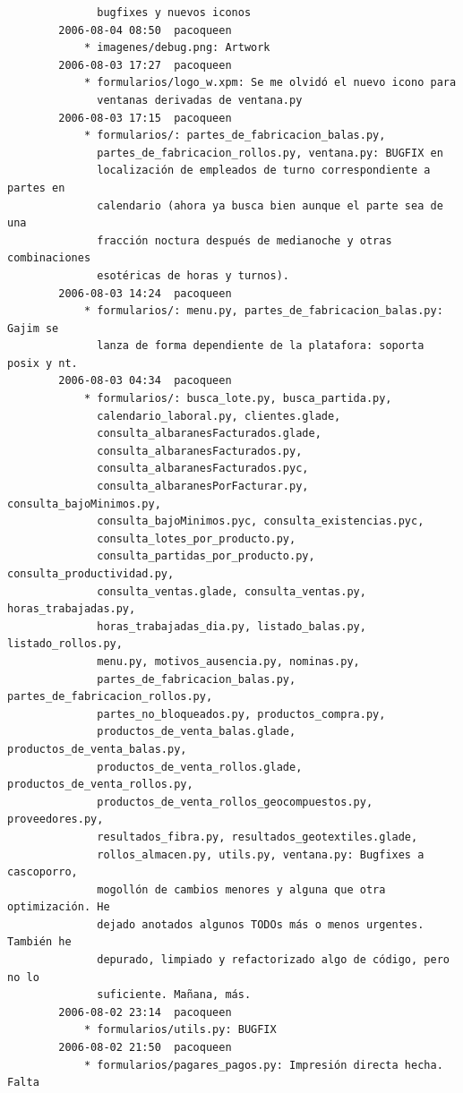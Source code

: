 \documentclass[a4paper]{article}
\begin{document}
\begin{verbatim}
              bugfixes y nuevos iconos
        2006-08-04 08:50  pacoqueen
            * imagenes/debug.png: Artwork
        2006-08-03 17:27  pacoqueen
            * formularios/logo_w.xpm: Se me olvidó el nuevo icono para
              ventanas derivadas de ventana.py
        2006-08-03 17:15  pacoqueen
            * formularios/: partes_de_fabricacion_balas.py,
              partes_de_fabricacion_rollos.py, ventana.py: BUGFIX en
              localización de empleados de turno correspondiente a partes en
              calendario (ahora ya busca bien aunque el parte sea de una
              fracción noctura después de medianoche y otras combinaciones
              esotéricas de horas y turnos).
        2006-08-03 14:24  pacoqueen
            * formularios/: menu.py, partes_de_fabricacion_balas.py: Gajim se
              lanza de forma dependiente de la platafora: soporta posix y nt.
        2006-08-03 04:34  pacoqueen
            * formularios/: busca_lote.py, busca_partida.py,
              calendario_laboral.py, clientes.glade,
              consulta_albaranesFacturados.glade,
              consulta_albaranesFacturados.py,
              consulta_albaranesFacturados.pyc,
              consulta_albaranesPorFacturar.py, consulta_bajoMinimos.py,
              consulta_bajoMinimos.pyc, consulta_existencias.pyc,
              consulta_lotes_por_producto.py,
              consulta_partidas_por_producto.py, consulta_productividad.py,
              consulta_ventas.glade, consulta_ventas.py, horas_trabajadas.py,
              horas_trabajadas_dia.py, listado_balas.py, listado_rollos.py,
              menu.py, motivos_ausencia.py, nominas.py,
              partes_de_fabricacion_balas.py, partes_de_fabricacion_rollos.py,
              partes_no_bloqueados.py, productos_compra.py,
              productos_de_venta_balas.glade, productos_de_venta_balas.py,
              productos_de_venta_rollos.glade, productos_de_venta_rollos.py,
              productos_de_venta_rollos_geocompuestos.py, proveedores.py,
              resultados_fibra.py, resultados_geotextiles.glade,
              rollos_almacen.py, utils.py, ventana.py: Bugfixes a cascoporro,
              mogollón de cambios menores y alguna que otra optimización. He
              dejado anotados algunos TODOs más o menos urgentes. También he
              depurado, limpiado y refactorizado algo de código, pero no lo
              suficiente. Mañana, más.
        2006-08-02 23:14  pacoqueen
            * formularios/utils.py: BUGFIX
        2006-08-02 21:50  pacoqueen
            * formularios/pagares_pagos.py: Impresión directa hecha. Falta

\end{verbatim}
\end{document}
